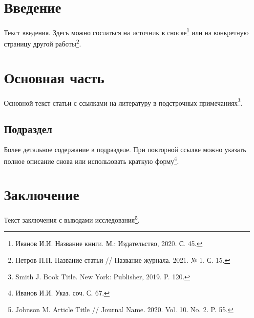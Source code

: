 \documentclass[12pt]{article}
\begin{document}



\vspace{1em}


\section{Введение}

Текст введения. Здесь можно сослаться на источник в сноске\footnote{Иванов И.И. Название книги. М.: Издательство, 2020. С. 45.} или на конкретную страницу другой работы\footnote{Петров П.П. Название статьи // Название журнала. 2021. № 1. С. 15.}.

\section{Основная часть}

Основной текст статьи с ссылками на литературу в подстрочных примечаниях\footnote{Smith J. Book Title. New York: Publisher, 2019. P. 120.}.

\subsection{Подраздел}

Более детальное содержание в подразделе. При повторной ссылке можно указать полное описание снова или использовать краткую форму\footnote{Иванов И.И. Указ. соч. С. 67.}.

\section{Заключение}

Текст заключения с выводами исследования\footnote{Johnson M. Article Title // Journal Name. 2020. Vol. 10. No. 2. P. 55.}.

%
%
\end{document}

